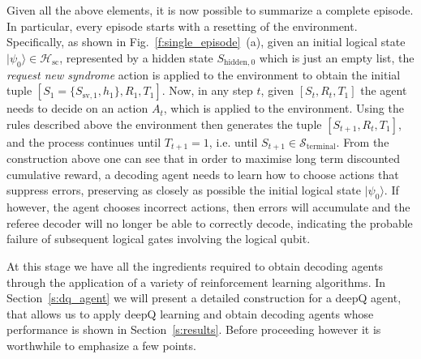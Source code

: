 \documentclass[twocolumn,preprintnumbers,amsmath,amssymb,notitlepage,nofootinbib,longbibliography,superscriptaddress,aps,pra,10pt]{revtex4-1}
\begin{document}
	Given all the above elements, it is now possible to summarize a complete episode.
	In particular, every episode starts with a resetting of the environment.
	Specifically, as shown in Fig.~\ref{f:single_episode}~(a), given an initial logical state $|\psi_0\rangle \in \mathcal{H}_{\mathrm{sc}}$, represented by a hidden state $S_{\mathrm{hidden},0}$ which is just an empty list, the \emph{request new syndrome} action is applied to the environment to obtain the initial tuple $[S_{1} = \{S_{\mathrm{sv},1},h_{1}\},R_{1},T_{1}]$.
	Now, in any step $t$, given $[S_{t},R_{t},T_{1}]$ the agent needs to decide on an action $A_t$, which is applied to the environment.
	Using the rules described above the environment then generates the tuple $[S_{t+1},R_{t},T_{1}]$, and the process continues until $T_{t+1} = 1$, i.e. until $S_{t+1} \in \mathcal{S}_\mathrm{terminal}$.
	From the construction above one can see that in order to maximise long term discounted cumulative reward, a decoding agent needs to learn how to choose actions that suppress errors, preserving as closely as possible the initial logical state $|\psi_0\rangle$.
	If however, the agent chooses incorrect actions, then errors will accumulate and the referee decoder will no longer be able to correctly decode, indicating the probable failure of subsequent logical gates involving the logical qubit.

	At this stage we have all the ingredients required to obtain decoding agents through the application of a variety of reinforcement learning algorithms.
	In Section~\ref{s:dq_agent} we will present a detailed construction for a deepQ agent, that allows us to apply deepQ learning and obtain decoding agents whose performance is shown in Section~\ref{s:results}.
	Before proceeding however it is worthwhile to emphasize a few points.
\end{document}
